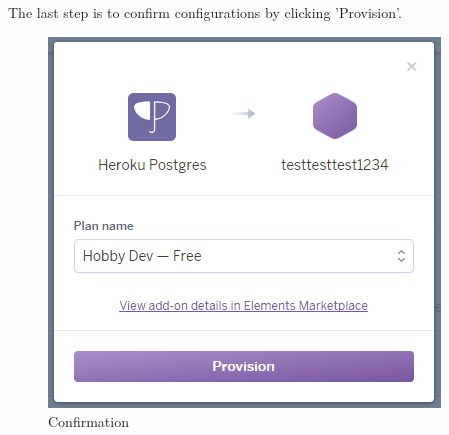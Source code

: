 \documentclass[12pt,a4paper]{article}
\begin{document}
The last step is to confirm configurations by clicking 'Provision'.
\begin{figure}[H]
	\centering
	\includegraphics{images/postgres1.PNG}
	\caption{Confirmation}
	\label{fig:addonn}
\end{figure}
\end{document}
